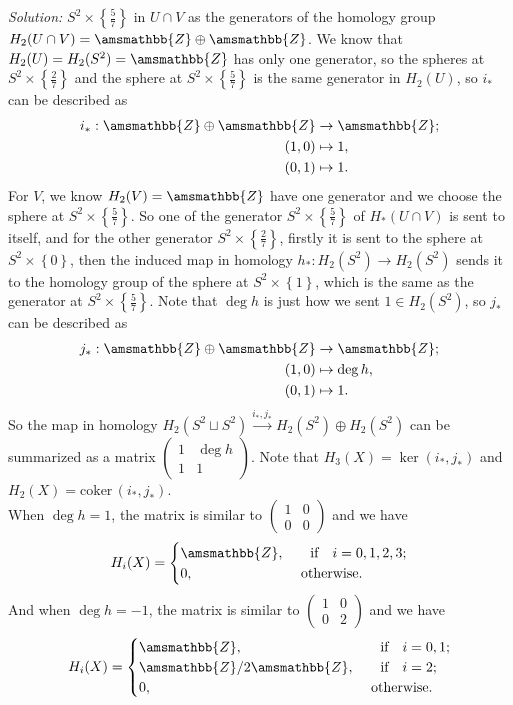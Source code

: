 \documentclass[a4paper, 12pt]{article}
\newenvironment{solution}
    {\textit{Solution:}}
    {}
\renewcommand{\mathbb}{\amsmathbb}
\newcommand{\iif}{\ \ \ \text{if}\ \ \ }
\newcommand{\otherwise}{\text{otherwise}}
\newcommand{\coker}{\text{coker}\,}
\begin{document}
\begin{solution}
\(S^2\times \left\{ \frac{5}{7} \right\}\) in \(U\cap V\) as the generators of the homology group \(H_2(U\cap V)=\mathbb{Z}\oplus \mathbb{Z}\). We know that \(H_2(U)=H_2(S^2)=\mathbb{Z}\) has only one generator, so the spheres at \(S^2\times \left\{  \frac{2}{7}\right\}\) and the sphere 
at \(S^2\times \left\{ \frac{5}{7} \right\}\) is the same generator in \(H_2(U)\), so \(i_*\) can be described as 
\begin{align*}
    i_*:\mathbb{Z}\oplus \mathbb{Z}&\rightarrow \mathbb{Z};\\ 
        (1,0)&\mapsto 1,\\ 
        (0,1)&\mapsto 1.
\end{align*}
For \(V\), we know \(H_2(V)=\mathbb{Z}\) have one generator and we choose the sphere at \(S^2\times \left\{ \frac{5}{7} \right\}\). So one of the generator \(S^2\times \left\{ \frac{5}{7} \right\}\) of \(H_*(U\cap V)\) is sent to itself, and for the other generator \(S^2\times \left\{ \frac{2}{7} \right\}\), firstly it is sent to the sphere at 
\(S^2\times \left\{ 0 \right\}\), then the induced map in homology \(h_*:H_2(S^2)\rightarrow H_2(S^2)\) sends it to the homology group of the sphere at \(S^2\times \left\{ 1 \right\}\), which is the same as the generator at \(S^2\times \left\{ \frac{5}{7} \right\}\). Note that 
\(\deg h\) is just how we sent \(1\in H_2(S^2)\), so \(j_*\) can be described as 
\begin{align*}
    j_*:\mathbb{Z}\oplus \mathbb{Z}&\rightarrow \mathbb{Z};\\ 
    (1,0)&\mapsto \deg h,\\ 
    (0,1)&\mapsto 1.
\end{align*}
So the map in homology \(H_2(S^2\sqcup S^2)\xrightarrow{i_*,j_*}H_2(S^2)\oplus H_2(S^2)\) can be summarized as a matrix \(\begin{pmatrix}
    1&\deg h\\ 
    1&1
\end{pmatrix}\). Note that \(H_3(X)=\ker (i_*,j_*)\) and \(H_2(X)=\coker (i_*,j_*)\).\\ 
When \(\deg h=1\), the matrix is similar to \(\begin{pmatrix}
    1&0\\ 
    0&0
\end{pmatrix}\) and we have 
\[H_i(X)=\begin{cases}
    \mathbb{Z},&\iif i=0,1,2,3;\\ 
    0,&\ \otherwise.
\end{cases}\]
And when \(\deg h=-1\), the matrix is similar to \(\begin{pmatrix}
    1&0\\ 
    0&2
\end{pmatrix}\) and we have 
\[H_i(X)=\begin{cases}
    \mathbb{Z},&\iif i=0,1;\\ 
    \mathbb{Z}/2 \mathbb{Z},&\iif i=2;\\
    0,&\ \otherwise.
\end{cases}\]
\end{solution}
\end{document}
